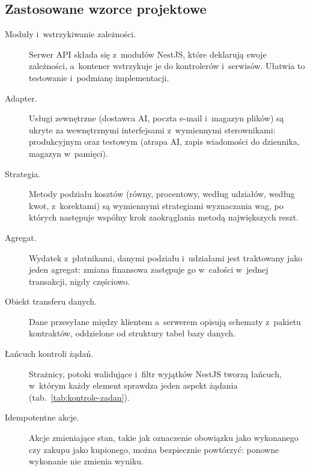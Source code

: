 \subsection{Zastosowane wzorce projektowe}

\begin{description}
  \item[Moduły i~wstrzykiwanie zależności.] Serwer API składa się z~modułów NestJS, które deklarują swoje zależności, a~kontener wstrzykuje je do kontrolerów i~serwisów. Ułatwia to testowanie i~podmianę implementacji.
  \item[Adapter.] Usługi zewnętrzne (dostawca AI, poczta e-mail i~magazyn plików) są ukryte za wewnętrznymi interfejsami z~wymiennymi sterownikami: produkcyjnym oraz testowym (atrapa AI, zapis wiadomości do dziennika, magazyn w~pamięci).
  \item[Strategia.] Metody podziału kosztów (równy, procentowy, według udziałów, według kwot, z~korektami) są wymiennymi strategiami wyznaczania wag, po których następuje wspólny krok zaokrąglania metodą największych reszt.
  \item[Agregat.] Wydatek z~płatnikami, danymi podziału i~udziałami jest traktowany jako jeden agregat: zmiana finansowa zastępuje go w~całości w~jednej transakcji, nigdy częściowo.
  \item[Obiekt transferu danych.] Dane przesyłane między klientem a~serwerem opisują schematy z~pakietu kontraktów, oddzielone od struktury tabel bazy danych.
  \item[Łańcuch kontroli żądań.] Strażnicy, potoki walidujące i~filtr wyjątków NestJS tworzą łańcuch, w~którym każdy element sprawdza jeden aspekt żądania (tab.~\ref{tab:kontrole-zadan}).
  \item[Idempotentne akcje.] Akcje zmieniające stan, takie jak oznaczenie obowiązku jako wykonanego czy zakupu jako kupionego, można bezpiecznie powtórzyć: ponowne wykonanie nie zmienia wyniku.
\end{description}
